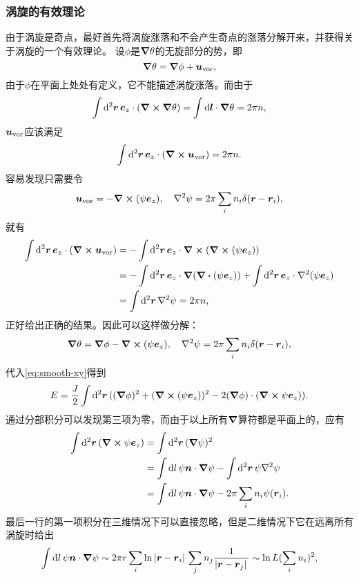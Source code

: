 \documentclass[hyperref, UTF8, a4paper]{ctexart}
\begin{document}
\subsubsection{涡旋的有效理论}

由于涡旋是奇点，最好首先将涡旋涨落和不会产生奇点的涨落分解开来，并获得关于涡旋的一个有效理论。
设$\phi$是$\grad{\theta}$的无旋部分的势，即
\[
    \grad{\theta} = \grad{\phi} + \vb*{u}_\text{vor},
\]
由于$\phi$在平面上处处有定义，它不能描述涡旋涨落。而由于
\[
    \int \dd[2]{\vb*{r}} \vb*{e}_z \cdot (\curl{\grad{\theta}}) = \int \dd{\vb*{l}} \cdot \grad{\theta} = 2\pi n, 
\]
$\vb*{u}_\text{vor}$应该满足
\[
    \int \dd[2]{\vb*{r}} \vb*{e}_z \cdot (\curl{\vb*{u}_\text{vor}}) = 2 \pi n.
\]
容易发现只需要令
\[
    \vb*{u}_\text{vor} = - \curl{(\psi \vb*{e}_z)}, \quad \laplacian{\psi} = 2\pi \sum_i n_i \delta(\vb*{r} - \vb*{r}_i),
\]
就有
\[
    \begin{aligned}
        \int \dd[2]{\vb*{r}} \vb*{e}_z \cdot (\curl{\vb*{u}_\text{vor}}) &= - \int \dd[2]{\vb*{r}} \vb*{e}_z \cdot \curl{(\curl{(\psi \vb*{e}_z)})} \\
        &= - \int \dd[2]{\vb*{r}} \vb*{e}_z \cdot \grad{(\div{(\psi \vb*{e}_z)})} + \int \dd[2]{\vb*{r}} \vb*{e}_z \cdot \laplacian (\psi \vb*{e}_z) \\
        &= \int \dd[2]{\vb*{r}} \laplacian{\psi} = 2 \pi n,
    \end{aligned}
\]
正好给出正确的结果。因此可以这样做分解：
\begin{equation}
    \grad{\theta} = \grad{\phi} - \curl{(\psi \vb*{e}_z)}, \quad \laplacian{\psi} = 2\pi \sum_i n_i \delta(\vb*{r} - \vb*{r}_i),
\end{equation}
代入\eqref{eq:smooth-xy}得到
\[
    E = \frac{J}{2} \int \dd[2]{\vb*{r}} ((\grad{\phi})^2 + (\curl{(\psi \vb*{e}_z)})^2 - 2 (\grad{\phi}) \cdot (\curl{\psi \vb*{e}_z})).
\]
通过分部积分可以发现第三项为零，而由于以上所有$\grad$算符都是平面上的，应有
\[
    \begin{aligned}
        \int \dd[2]{\vb*{r}} (\curl{\psi \vb*{e}_z}) &= \int \dd[2]{\vb*{r}} (\grad{\psi})^2 \\
        &= \int \dd{l} \psi \vb*{n} \cdot \grad{\psi}  - \int \dd[2]{\vb*{r}} \psi \laplacian{\psi} \\
        &= \int \dd{l} \psi \vb*{n} \cdot \grad{\psi} - 2\pi \sum_{i} n_i \psi(\vb*{r}_i).
    \end{aligned}
\]
最后一行的第一项积分在三维情况下可以直接忽略，但是二维情况下它在远离所有涡旋时给出
\[
    \int \dd{l} \psi \vb*{n} \cdot \grad{\psi} \sim 2\pi r \sum_i \ln \abs*{\vb*{r} - \vb*{r}_i} \sum_j n_j \frac{1}{\abs*{\vb*{r} - \vb*{r}_j}} \sim \ln L (\sum_i n_i)^2,
\]
\end{document}
